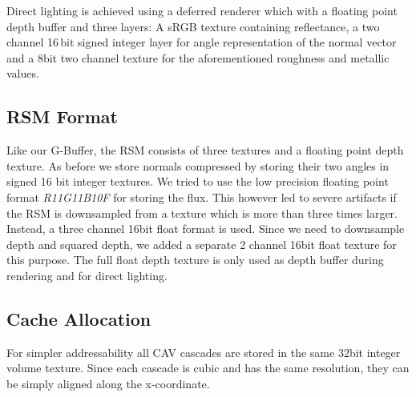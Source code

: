 \documentclass[thesis.tex]{subfiles}
\begin{document}
Direct lighting is achieved using a deferred renderer which with a floating point depth buffer and three layers:
A sRGB texture containing reflectance, a two channel 16\,bit signed integer layer for angle representation of the normal vector and a 8bit two channel texture for the aforementioned roughness and metallic values.

\subsection{RSM Format}
Like our G-Buffer, the RSM consists of three textures and a floating point depth texture.
As before we store normals compressed by storing their two angles in signed 16 bit integer textures.
We tried to use the low precision floating point format \emph{R11G11B10F} for storing the flux.
This however led to severe artifacts if the RSM is downsampled from a texture which is more than three times larger.
Instead, a three channel 16bit float format is used.
Since we need to downsample depth and squared depth, we added a separate 2 channel 16bit float texture for this purpose.
The full float depth texture is only used as depth buffer during rendering and for direct lighting.

\subsection{Cache Allocation} \label{sec:impl:cachealloc}
For simpler addressability all CAV cascades are stored in the same 32bit integer volume texture.
Since each cascade is cubic and has the same resolution, they can be simply aligned along the x-coordinate.
\end{document}
